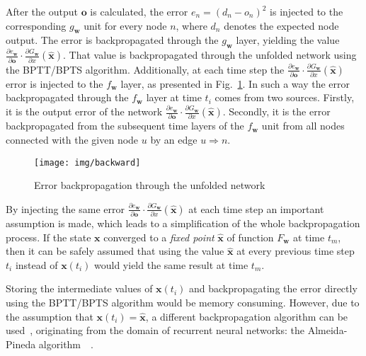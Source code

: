 After the output $\bm{o}$ is calculated, the error $e_n = (d_n - o_n)^2$ is injected to the corresponding $g_{\bm{w}}$ unit for every node $n$, where $d_n$ denotes the expected node output. The error is backpropagated through the $g_{\bm{w}}$ layer, yielding the value $\frac{\partial e_{\bm{w}}}{\partial \bm{o}}\cdot \frac{\partial G_{\bm{w}}}{\partial x}(\hat{\bm{x}})$. That value is backpropagated through the unfolded network using the BPTT/BPTS algorithm. Additionally, at each time step the $\frac{\partial e_{\bm{w}}}{\partial \bm{o}}\cdot \frac{\partial G_{\bm{w}}}{\partial x}(\hat{\bm{x}})$ error is injected to the $f_{\bm{w}}$ layer, as presented in Fig.~\ref{fig:gnn_backward}. In such a way the error backpropagated through the $f_{\bm{w}}$ layer at time $t_i$ comes from two sources. Firstly, it is the output error of the network $\frac{\partial e_{\bm{w}}}{\partial \bm{o}}\cdot \frac{\partial G_{\bm{w}}}{\partial x}(\hat{\bm{x}})$. Secondly, it is the error backpropagated from the subsequent time layers of the $f_{\bm{w}}$ unit from all nodes connected with the given node $u$ by an edge $u \Rightarrow n$.

\begin{figure}[h!]
\begin{center}
	\texttt{[image: img/backward]}
	\caption{Error backpropagation through the unfolded network}
	\label{fig:gnn_backward}
\end{center}
\end{figure}

By injecting the same error $\frac{\partial e_{\bm{w}}}{\partial \bm{o}}\cdot \frac{\partial G_{\bm{w}}}{\partial x}(\hat{\bm{x}})$ at each time step an important assumption is made, which leads to a simplification of the whole backpropagation process. If the state $\bm{x}$ converged to a \emph{fixed point} $\hat{\bm{x}}$ of function $F_{\bm{w}}$ at time $t_m$, then it can be safely assumed that using the value $\hat{\bm{x}}$ at every previous time step $t_i$ instead of $\bm{x}(t_i)$ would yield the same result at time $t_m$.

Storing the intermediate values of $\bm{x}(t_i)$ and backpropagating the error directly using the BPTT/BPTS algorithm would be memory consuming. However, due to the assumption that $\bm{x}(t_i) = \hat{\bm{x}}$, a different backpropagation algorithm can be used~\cite{scarselli2009graph}, originating from the domain of recurrent neural networks: the Almeida-Pineda algorithm~\cite{pineda1987generalization}~\cite{williams1995gradient}.


